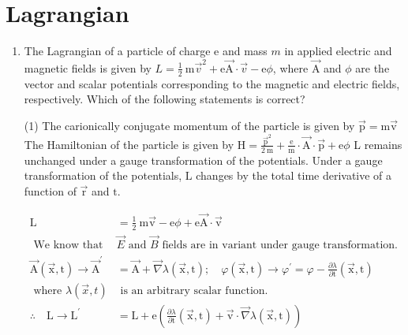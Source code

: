 \section{Lagrangian}
\begin{enumerate}
	\item The Lagrangian of a particle of charge e and mass $m$ in applied electric and magnetic fields is given by $L=\frac{1}{2} \mathrm{~m} \vec{v}^{2}+\mathrm{e} \overrightarrow{\mathrm{A}} \cdot \vec{v}-\mathrm{e} \phi$, where $\overrightarrow{\mathrm{A}}$ and $\phi$ are the vector and scalar potentials corresponding to the magnetic and electric fields, respectively. Which of the following statements is correct?
	 \begin{tasks}(1)
		\task[\textbf{a.}] The carionically conjugate momentum of the particle is given by $\overrightarrow{\mathrm{p}}=\mathrm{m} \overrightarrow{\mathrm{v}}$
		\task[\textbf{b.}]The Hamiltonian of the particle is given by $\mathrm{H}=\frac{\overrightarrow{\mathrm{p}}^{2}}{2 \mathrm{~m}}+\frac{\mathrm{e}}{\mathrm{m}} \cdot \overrightarrow{\mathrm{A}} \cdot \overrightarrow{\mathrm{p}}+\mathrm{e} \phi$
		\task[\textbf{c.}]L remains unchanged under a gauge transformation of the potentials.
		\task[\textbf{d.}]  Under a gauge transformation of the potentials, $\mathrm{L}$ changes by the total time derivative of a function of $\overrightarrow{\mathrm{r}}$ and $\mathrm{t}$.
	\end{tasks}
	\begin{answer}
		\begin{align*}
		\mathrm{L}&=\frac{1}{2} \mathrm{~m} \overrightarrow{\mathrm{v}}-\mathrm{e} \phi+\mathrm{e} \overrightarrow{\mathrm{A}} \cdot \overrightarrow{\mathrm{v}}\\
	\text{	We know that }&\text{$\vec{E}$ and $\vec{B}$ fields are in variant under gauge transformation.}\\
		\overrightarrow{\mathrm{A}}(\overrightarrow{\mathrm{x}}, \mathrm{t}) \rightarrow \overrightarrow{\mathrm{A}}^{\prime}&=\overrightarrow{\mathrm{A}}+\vec{\nabla} \lambda(\overrightarrow{\mathrm{x}}, \mathrm{t}) ; \quad \varphi(\overrightarrow{\mathrm{x}}, \mathrm{t}) \rightarrow \varphi^{\prime}=\varphi-\frac{\partial \lambda}{\partial \mathrm{t}}(\overrightarrow{\mathrm{x}}, \mathrm{t})\\
	\text{	where $\lambda(\vec{x}, t)$}&\text{ is an arbitrary scalar function.}\\
		\therefore \quad \mathrm{L} \rightarrow \mathrm{L}^{\prime}&=\mathrm{L}+\mathrm{e}\left(\frac{\partial \lambda}{\partial \mathrm{t}}(\overrightarrow{\mathrm{x}}, \mathrm{t})+\overrightarrow{\mathrm{v}} \cdot \vec{\nabla} \lambda(\overrightarrow{\mathrm{x}}, \mathrm{t})\right)

\end{align*}
\end{answer}
\end{enumerate}
